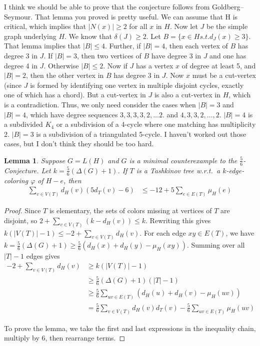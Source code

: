 \documentclass[12pt]{amsart}
\theoremstyle{plain}
\newtheorem{lem}[thm]{Lemma}
\theoremstyle{definition}
\theoremstyle{remark}
\newcommand{\vph}{\varphi}
\begin{document}
I think we should be able to prove that the conjecture follows from
Goldberg--Seymour.
That lemma you proved is pretty useful.  We can assume that H is
critical, which implies that $|N(x)| \ge 2$ for all $x$ in $H$.  Now let $J$
be the simple graph underlying $H$.  We know that $\delta(J) \ge 2$.  Let
$B = \{ x \in H s.t. d_J(x) \ge 3\}$.  That lemma implies that $|B| \le 4$.
Further, if $|B| = 4$, then each vertex of $B$ has degree 3 in $J$.  If
$|B|=3$, then two vertices of $B$ have degree 3 in $J$ and one has degree 4
in $J$.  Otherwise $|B| \le 2$.  Now if $J$ has a vertex $x$ of degree at
least 5, and $|B|=2$, then the other vertex in $B$ has degree 3 in $J$.  Now
$x$ must be a cut-vertex (since $J$ is formed by identifying one vertex in
multiple disjoint cycles, exactly one of which has a chord).  But a
cut-vertex in $J$ is also a cut-vertex in $H$, which is a contradiction.
Thus, we only need consider the cases when $|B|=3$ and $|B|=4$, which have
degree sequences $3,3,3,3,2,\ldots2$. and $4,3,3,2,\ldots,2$.
$|B|=4$ is a subdivided $K_4$ or a subdivision of a 4-cycle where one
matching has multiplicity 2.
$|B|=3$ is a subdivision of a triangulated 5-cycle.  I haven't worked
out those cases, but I don't think they should be too hard.
\newpage

\begin{lem}
\label{lem-A}
Suppose $G=L(H)$ and $G$ is a minimal counterexample to the
$\frac56$-Conjecture.  Let $k = \frac56(\Delta(G)+1)$.  If $T$ is a Tashkinov
tree w.r.t.~a $k$-edge-coloring $\vph$ of $H-e$, then
\begin{align*}
\sum_{v\in V(T)}d_H(v)(5d_T(v)-6) &\le -12 + 5\sum_{e\in E(T)}\mu_H(e)
\end{align*}
\end{lem}
\begin{proof}
Since $T$ is elementary, the sets of colors missing at vertices of $T$ are
disjoint, so $2+\sum_{v\in V(T)}(k-d_H(v))\le k$.  Rewriting this gives
$k(|V(T)|-1)\le -2 + \sum_{v\in V(T)}d_H(v)$.  
For each edge $xy\in E(T)$, we
have $k = \frac56(\Delta(G)+1)\ge \frac56(d_H(x)+d_H(y)-\mu_H(xy))$.
Summing over all $|T|-1$ edges gives
\begin{align*}
-2 + \sum_{v\in V(T)} d_H(v) &\ge k(|V(T)|-1) \\
&\ge \frac56(\Delta(G)+1)(|T|-1) \\
&\ge \frac56 \sum_{uv\in E(T)}(d_H(u)+d_H(v)-\mu_H(uv)) \\
& = \frac56\sum_{v\in V(T)}d_H(v)d_T(v)-\frac56\sum_{uv\in E(T)}\mu_H(uv)
\end{align*}

To prove the lemma, we take the first and last expressions in the inequality
chain, multiply by 6, then rearrange terms.
\end{proof}
\end{document}

